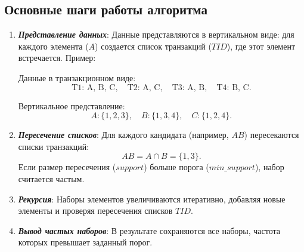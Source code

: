 \subsection{\textbf{Основные шаги работы алгоритма}}
\begin{enumerate}
    \item {\textbf{\textit{Представление данных}}:\newline
   Данные представляются в вертикальном виде: для каждого элемента (\(A\)) создается список транзакций (\(TID\)), где этот элемент встречается.\newline
   Пример:\par  
     Данные в транзакционном виде:  
     \[
     \text{T1: A, B, C}, \quad \text{T2: A, C}, \quad \text{T3: A, B}, \quad \text{T4: B, C}.
     \]  \par
     Вертикальное представление:  
     \[
     A: \{1, 2, 3\}, \quad B: \{1, 3, 4\}, \quad C: \{1, 2, 4\}.
     \]}
     \item {\textbf{\textit{Пересечение списков}}:\newline
   Для каждого кандидата (например, \(AB\)) пересекаются списки транзакций:  
     \[
     AB = A \cap B = \{1, 3\}.
     \]\newline
   Если размер пересечения (\(support\)) больше порога (\(min\_support\)), набор считается частым.}
   \item {\textbf{\textit{Рекурсия}}:\newline
   Наборы элементов увеличиваются итеративно, добавляя новые элементы и проверяя пересечения списков \(TID\).}
   \item {\textbf{\textit{Вывод частых наборов}}:\newline
   В результате сохраняются все наборы, частота которых превышает заданный порог.}
\end{enumerate}

